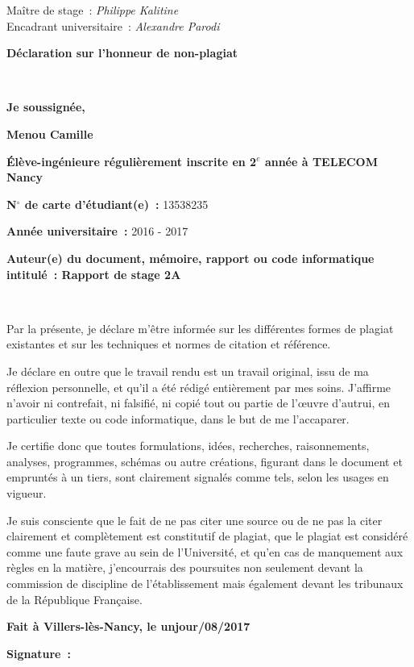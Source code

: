 \documentclass[12pt]{article}
\begin{document}
{\raggedright
Maître de stage~: \textit{Philippe Kalitine}
\\
Encadrant universitaire~: \textit{Alexandre Parodi}\pagebreak{}
}

\begin{center}
\textbf{{\huge Déclaration sur l'honneur de non-plagiat}}
\end{center}

$ $

\textbf{Je soussignée,}

\textbf{Menou Camille}

\textbf{\'{E}lève-ingénieure régulièrement inscrite en 2$^{e}$
année à TELECOM Nancy}

\textbf{N$^\circ{}$ de carte d'étudiant(e)~:} 13538235

\textbf{Année universitaire~:} 2016 - 2017

\textbf{Auteur(e) du document, m\'{e}moire, rapport ou code informatique
intitul\'{e}~: Rapport de stage 2A}

$ $


Par la présente, je déclare m'être informée sur les
différentes formes de plagiat existantes et sur les techniques et normes de
citation et référence.

Je déclare en outre que le travail rendu est un travail original, issu de ma
réflexion personnelle, et qu'il a été rédigé entièrement
par mes soins. J'affirme n'avoir ni contrefait, ni falsifié, ni copié
tout ou partie de l'\oe{}uvre d'autrui, en particulier texte ou code
informatique, dans le but de me l'accaparer.

Je certifie donc que toutes formulations, idées, recherches, raisonnements,
analyses, programmes, schémas ou autre créations, figurant dans le
document et empruntés à un tiers, sont clairement signalés comme
tels, selon les usages en vigueur.

Je suis consciente que le fait de ne pas citer une source ou de ne pas la
citer clairement et complètement est constitutif de plagiat, que le plagiat est
considéré comme une faute grave au sein de l'Université, et qu'en cas
de manquement aux règles en la matière, j'encourrais des poursuites non
seulement devant la commission de discipline de l'établissement mais
également devant les tribunaux de la République Française.

\begin{center}
\textbf{Fait à Villers-lès-Nancy, le unjour/08/2017}
\end{center}

\begin{center}
\textbf{Signature~:}
\end{center}
\end{document}
